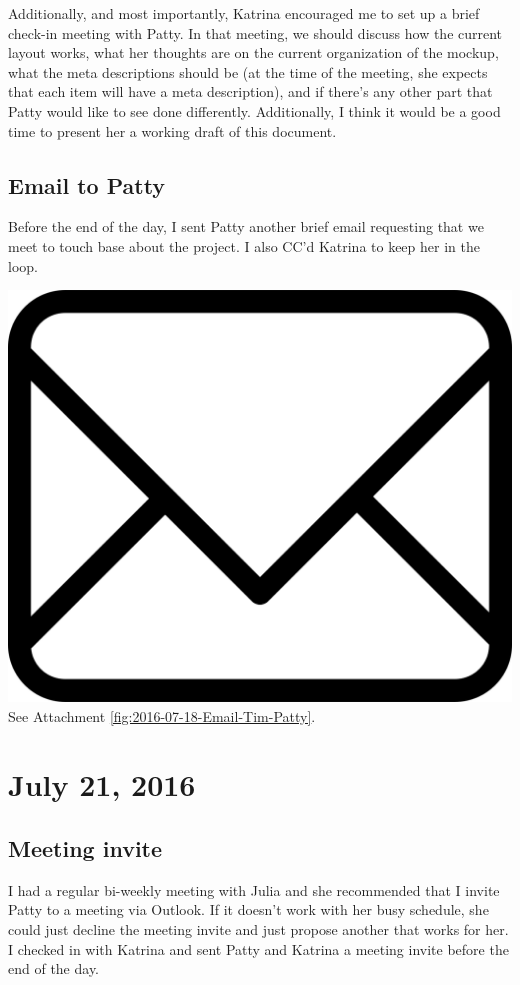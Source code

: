 \documentclass{article}
\begin{document}
Additionally, and most importantly, Katrina encouraged me to set up a brief check-in meeting with Patty. In that meeting, we should discuss how the current layout works, what her thoughts are on the current organization of the mockup, what the meta descriptions should be (at the time of the meeting, she expects that each item will have a meta description), and if there's any other part that Patty would like to see done differently. Additionally, I think it would be a good time to present her a working draft of this document. 

\subsection{Email to Patty}
Before the end of the day, I sent Patty another brief email requesting that we meet to touch base about the project. I also CC'd Katrina to keep her in the loop.

\vspace{2em}
\noindent\includegraphics[height=\fontcharht\font`\B]{icons/attachment-email} See Attachment \ref{fig:2016-07-18-Email-Tim-Patty}.
\vspace{2em}

\section{July 21, 2016}
\subsection{Meeting invite}
I had a regular bi-weekly meeting with Julia and she recommended that I invite Patty to a meeting via Outlook. If it doesn't work with her busy schedule, she could just decline the meeting invite and just propose another that works for her. I checked in with Katrina and sent Patty and Katrina a meeting invite before the end of the day.
\end{document}
